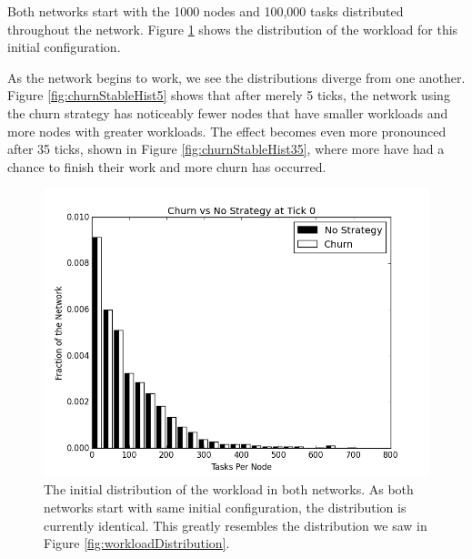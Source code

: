 \documentclass[10pt,conference]{IEEEtran}
\begin{document}
	Both networks start with the 1000 nodes and 100,000 tasks distributed throughout the network. 
	Figure \ref{fig:churnStableHist0} shows the distribution of the workload for this initial configuration.
	
	As the network begins to work, we see the distributions diverge from one another.
	Figure \ref{fig:churnStableHist5} shows that after merely 5 ticks, the network using the churn strategy has noticeably fewer nodes that have smaller workloads and more nodes with greater workloads.
	The effect becomes even more pronounced after 35 ticks, shown in Figure \ref{fig:churnStableHist35}, where more have had a chance to finish their work and more churn has occurred.
	
	\begin{figure}
		\centering
		\includegraphics[width=0.9\linewidth]{figs/ChurnStableHist0}
		\caption[Workload for churn at tick 0]{The initial distribution of the workload in both networks.  As both networks start with same initial configuration, the distribution is currently identical.  This greatly resembles the distribution we saw in Figure \ref{fig:workloadDistribution}.}
		
		\label{fig:churnStableHist0}
	\end{figure}
	
\end{document}
